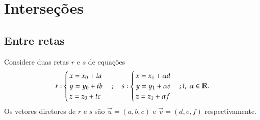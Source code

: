 \section{Interse\c{c}\~oes} %
\label{sec:intersecoes}
\subsection{Entre retas} %
\label{sub:entre_retas}
Considere duas retas $r$ e $s$ de equa\c{c}\~oes
\[
    r: \begin{cases}
        x = x_0 + ta\\
        y = y_0 + tb\\
        z = z_0 + tc
    \end{cases}; \quad s: \begin{cases}
        x = x_1 + \alpha d\\
        y = y_1 + \alpha e\\
        z = z_1 + \alpha f
    \end{cases}; t,\ \alpha \in \mathbb{R}.
\]
Os vetores diretores de $r$ e $s$ s\~ao $\vec{u} = (a,b,c)$ e $\vec{v} = (d,e,f)$ respectivamente.
